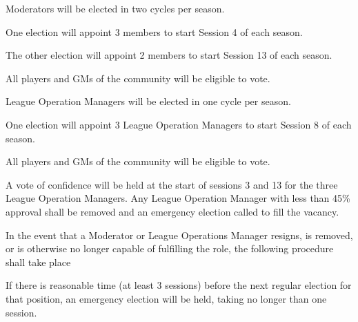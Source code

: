 \begin{deepEnumerate}
\begin{deepEnumerate}
	\end{deepEnumerate}
	\item Moderators will be elected in two cycles per season.
	\begin{deepEnumerate}
		\item One election will appoint 3 members to start Session 4 of each season.
		\item The other election will appoint 2 members to start Session 13 of each season.
		\item All players and GMs of the community will be eligible to vote.
	\end{deepEnumerate}
	\item League Operation Managers will be elected in one cycle per season.
	\begin{deepEnumerate}
		\item One election will appoint 3 League Operation Managers to start Session 8 of each season.
		\item All players and GMs of the community will be eligible to vote.
		\item A vote of confidence will be held at the start of sessions 3 and 13 for the three League Operation Managers. Any League Operation Manager with less than
		 45\% approval shall be removed and an emergency election called to fill the vacancy.
	\end{deepEnumerate}
	\item In the event that a Moderator or League Operations Manager resigns, is removed, or is otherwise no longer capable of fulfilling the role, the following
	procedure shall take place 
	\begin{deepEnumerate}
		\item If there is reasonable time (at least 3 sessions) before the next regular election for that position, an emergency election will be held, taking no longer than one session. 
	

\end{deepEnumerate}
\end{deepEnumerate}
